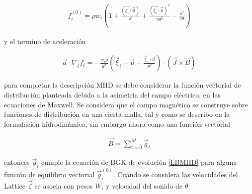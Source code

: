 \begin{eqnarray}
    f_{i}^{(0)} = \rho w_{i}\left(1+\frac{(\vec{\xi_{i}}\cdot\vec{u})}{\theta}+\frac{(\vec{\xi_{i}}\cdot\vec{u})^{2}}{2\theta^{2}}-\frac{u^{2}}{2\theta}\right)
\end{eqnarray}

y el termino de aceleración 

\begin{eqnarray}
    \vec{a}\cdot\nabla_{\xi}f_{i} = -\frac{w_{i}\rho}{\theta^{2}}\left(\vec{\xi}_{i}-\vec{u}+\frac{\vec{\xi}_{i}\cdot\vec{u}}{\theta^{2}}\right)\cdot(\vec{J}\times\vec{B})
\end{eqnarray}

\noindent para completar la descripción MHD se debe considerar la función vectorial de distribución planteada debido a la asimetria del campo eléctrico, en las ecuaciones de Maxwell. Se considera que el campo magnético se construye sobre funciones de distribución en una cierta malla, tal y como se describo en la formulación hidrodinámica, sin embargo ahora como una función vectorial

\begin{eqnarray}
    \vec{B} = \sum_{i=0}^{M}\vec{g}_{i}
\end{eqnarray}

\noindent entonces $\vec{g}_{i}$ cumple la ecuación de BGK de evolución \eqref{LBMHD} para alguna función de equilibrio vectorial $\vec{g}_{i}^{(0)}$. Cuando se considera las velocidades del Lattice $\vec{\zeta}$ se asocia con pesos $W_{i}$ y velocidad del sonido de $\theta$